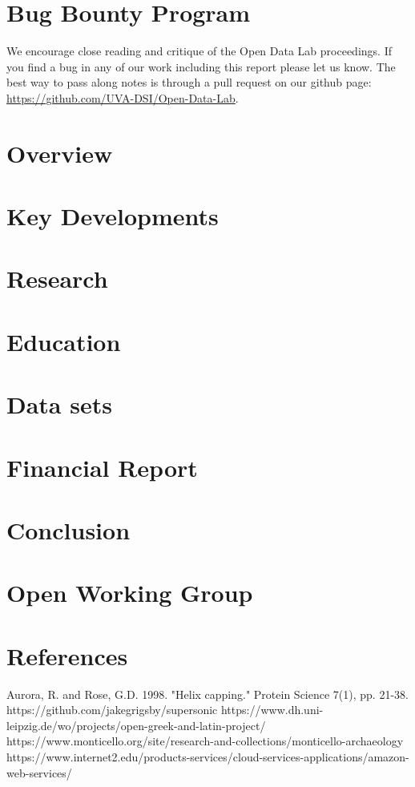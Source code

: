 \documentclass[12pt,letterpaper]{report} %
\begin{document}
\chapter*{Bug Bounty Program}
We encourage close reading and critique of the Open Data Lab proceedings. If you find a bug in any of our work including this report please let us know. The best way to pass along notes is through a pull request on our github page: \url{https://github.com/UVA-DSI/Open-Data-Lab}.

\tableofcontents
\listoffigures
\listoftables
\chapter{Overview} 
\chapter{Key Developments} 
\chapter{Research} 
\chapter{Education} 
\chapter{Data sets} 	
\chapter{Financial Report} 
\chapter{Conclusion}

\appendix
\chapter{Open Working Group}\label{chap:owg}
 

\chapter{References}
\begin{thebibliography}{99}
 Aurora, R. and Rose, G.D. 1998. "Helix capping." Protein Science 7(1), pp. 21-38.
 https://github.com/jakegrigsby/supersonic
 https://www.dh.uni-leipzig.de/wo/projects/open-greek-and-latin-project/
 https://www.monticello.org/site/research-and-collections/monticello-archaeology
 https://www.internet2.edu/products-services/cloud-services-applications/amazon-web-services/
\end{thebibliography}
\end{document}
